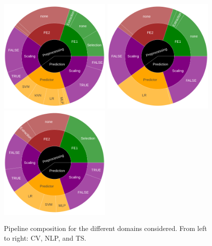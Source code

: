 \begin{figure}
    \centering
    \includegraphics[width=5.5cm]{img/sunburst/cv.png}
    \includegraphics[width=5.5cm]{img/sunburst/nlp.png}
    \includegraphics[width=5.5cm]{img/sunburst/ts.png}
    \caption{Pipeline composition for the different domains considered. From left to right: CV, NLP, and TS.}
    \label{fig:domain_composition}
    
    
    
\end{figure}

